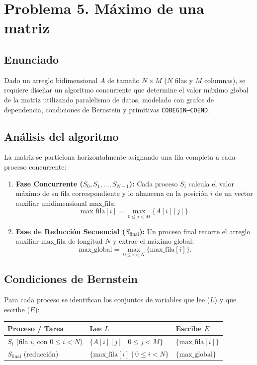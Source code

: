\section{Problema 5. M\'aximo de una matriz}

\subsection*{Enunciado}
Dado un arreglo bidimensional $A$ de tama\~no $N \times M$ ($N$ filas y $M$
columnas), se requiere dise\~nar un algoritmo concurrente que determine el valor
m\'aximo global de la matriz utilizando paralelismo de datos, modelado con
grafos de dependencia, condiciones de Bernstein y primitivas
\texttt{COBEGIN--COEND}.

\subsection*{An\'alisis del algoritmo}
La matriz se particiona horizontalmente asignando una fila completa a cada
proceso concurrente:
\begin{enumerate}[leftmargin=1.4cm]
    \item \textbf{Fase Concurrente ($S_0, S_1, \dots, S_{N-1}$):} Cada proceso
    $S_i$ calcula el valor m\'aximo de su fila correspondiente y lo almacena en
    la posici\'on $i$ de un vector auxiliar unidimensional $\text{max\_fila}$:
    \[
        \text{max\_fila}[i] = \max_{0 \le j < M} \{ A[i][j] \}.
    \]
    \item \textbf{Fase de Reducci\'on Secuencial ($S_{\text{final}}$):} Un proceso
    final recorre el arreglo auxiliar $\text{max\_fila}$ de longitud $N$ y
    extrae el m\'aximo global:
    \[
        \text{max\_global} = \max_{0 \le i < N} \{ \text{max\_fila}[i] \}.
    \]
\end{enumerate}

\subsection*{Condiciones de Bernstein}
Para cada proceso se identifican los conjuntos de variables que lee ($L$) y que
escribe ($E$):

\begin{center}
\begin{tabular}{lll}
\toprule
Proceso / Tarea & Lee $L$ & Escribe $E$ \\
\midrule
$S_i$ (fila $i$, con $0 \le i < N$) & $\{ A[i][j] \mid 0 \le j < M \}$ & $\{ \text{max\_fila}[i] \}$ \\
$S_{\text{final}}$ (reducci\'on)     & $\{ \text{max\_fila}[i] \mid 0 \le i < N \}$ & $\{ \text{max\_global} \}$ \\
\bottomrule
\end{tabular}
\end{center}

